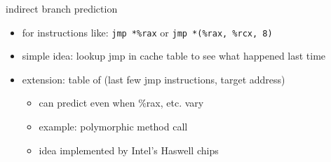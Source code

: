 \begin{frame}{indirect branch prediction}
    \begin{itemize}
    \item for instructions like: \texttt{jmp *\%rax} or \texttt{jmp *(\%rax, \%rcx, 8)}
    \item simple idea: lookup jmp in cache table to see what happened last time
    \vspace{.5cm}
    \item extension: table of (last few jmp instructions, target address)
        \begin{itemize}
        \item can predict even when \%rax, etc. vary
        \item example: polymorphic method call
        \item idea implemented by Intel's Haswell chips
        \end{itemize}
    \end{itemize}
\end{frame}
